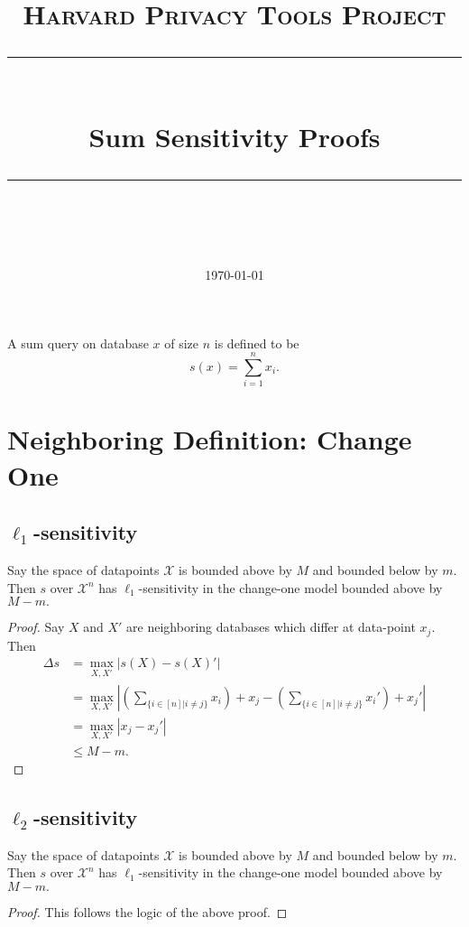 \documentclass[11pt]{scrartcl} %
\title{
	\normalfont\normalsize
	\textsc{Harvard Privacy Tools Project}\\ %
	\vspace{25pt} %
	\rule{\linewidth}{0.5pt}\\ %
	\vspace{20pt} %
	{\huge Sum Sensitivity Proofs}\\ %
	\vspace{12pt} %
	\rule{\linewidth}{2pt}\\ %
	\vspace{12pt} %
}
\date{\normalsize\today} %
\begin{document}
\maketitle

\begin{definition}
A sum query on database $x$ of size $n$ is defined to be
$$s(x) = \sum_{i=1}^n x_i.$$
\end{definition}

\section{Neighboring Definition: Change One}

\subsection{$\ell_1$-sensitivity}
\begin{theorem}
Say the space of datapoints $\mathcal{X}$ is bounded above by $M$ and bounded below by $m$. Then $s$ over $\mathcal{X}^n$ has $\ell_1$-sensitivity in the change-one model bounded above by $M-m.$
\end{theorem}

\begin{proof}
Say $X$ and $X'$ are neighboring databases which differ at data-point $x_j$. Then
\begin{align*}
\Delta{s} &= \max_{X,X'} \left\vert s(X) - s(X)' \right\vert \\
	&=  \max_{X,X'} \left\vert \left(\sum_{\{ i \in [n] \vert i \ne j\}} x_i\right) + x_j  - \left(\sum_{\{ i \in [n] \vert i \ne j\}} x_i'\right) + x_j'  \right\vert \\
	&= \max_{X,X'} \left\vert x_j - x_j' \right\vert \\
	&\le M-m.
\end{align*}
\end{proof}

\subsection{$\ell_2$-sensitivity}
\begin{theorem}
	Say the space of datapoints $\mathcal{X}$ is bounded above by $M$ and bounded below by $m$.
	Then $s$ over $\mathcal{X}^n$ has $\ell_1$-sensitivity in the change-one model bounded above by $M-m.$
\end{theorem}

\begin{proof}
This follows the logic of the above proof.
\end{proof}
\end{document}
